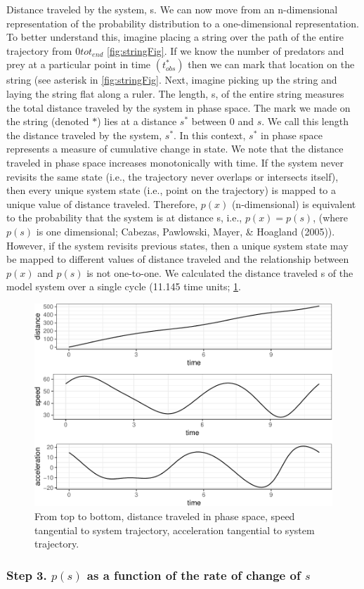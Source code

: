 \documentclass[12pt,twoside,openany]{reedthesis}
\begin{document}
Distance traveled by the system, s. We can now move from an n-dimensional representation of the probability distribution to a one-dimensional representation. To better understand this, imagine placing a string over the path of the entire trajectory from \(0 to t_{end}\) \ref{fig:stringFig}. If we know the number of predators and prey at a particular point in time \((t_{obs}^*)\) then we can mark that location on the string (see asterisk in \ref{fig:stringFig}. Next, imagine picking up the string and laying the string flat along a ruler. The length, s, of the entire string measures the total distance traveled by the system in phase space. The mark we made on the string (denoted \(*\)) lies at a distance \(s^*\) between 0 and \(s\). We call this length the distance traveled by the system, \(s^*\). In this context, \(s^*\) in phase space represents a measure of cumulative change in state. We note that the distance traveled in phase space increases monotonically with time. If the system never revisits the same state (i.e., the trajectory never overlaps or intersects itself), then every unique system state (i.e., point on the trajectory) is mapped to a unique value of distance traveled. Therefore, \(p(x)\) (n-dimensional) is equivalent to the probability that the system is at distance s, i.e., \(p(x)=p(s)\), (where \(p(s)\) is one dimensional; Cabezas, Pawlowski, Mayer, \& Hoagland (2005)). However, if the system revisits previous states, then a unique system state may be mapped to different values of distance traveled and the relationship between \(p(x)\) and \(p(s)\) is not one-to-one. We calculated the distance traveled s of the model system over a single cycle (11.145 time units; \ref{fig:distSpeedAccel}.
\begin{figure}
\includegraphics[width=0.85\linewidth]{_myDissertation_files/figure-latex/distSpeedAccel-1} \caption{From top to bottom, distance traveled in phase space, speed tangential to system trajectory, acceleration tangential to system trajectory.}\label{fig:distSpeedAccel}
\end{figure}
\hypertarget{step-3.-ps-as-a-function-of-the-rate-of-change-of-s}{%
\subsubsection{\texorpdfstring{\textbf{Step 3.} \(p(s)\) as a function of the rate of change of \(s\)}{Step 3. p(s) as a function of the rate of change of s}}\label{step-3.-ps-as-a-function-of-the-rate-of-change-of-s}}
\end{document}
